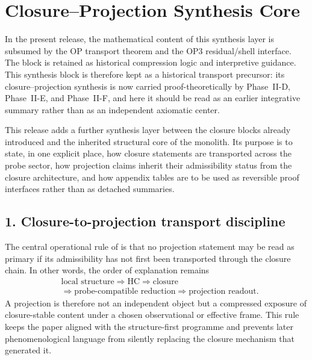 \section*{ Closure--Projection Synthesis Core}

\begin{remark}
\label{rem:normalization-note-v170}
In the present release, the mathematical content of this synthesis layer is subsumed by the OP transport theorem and the OP3 residual/shell interface. The block is retained as historical compression logic and interpretive guidance. This synthesis block is therefore kept as a historical transport precursor: its closure--projection synthesis is now carried proof-theoretically by Phase~II-D, Phase~II-E, and Phase~II-F, and here it should be read as an earlier integrative summary rather than as an independent axiomatic center.
\end{remark}

This release adds a further synthesis layer between the closure blocks already
introduced and the inherited structural core of the monolith. Its purpose is to
state, in one explicit place, how closure statements are transported across the
probe sector, how projection claims inherit their admissibility status from the
closure architecture, and how appendix tables are to be used as reversible proof
interfaces rather than as detached summaries.

\subsection*{1. Closure-to-projection transport discipline}
The central operational rule of  is that no projection statement may be
read as primary if its admissibility has not first been transported through the
closure chain. In other words, the order of explanation remains
\[
\begin{aligned}
&\text{local structure}
\Longrightarrow \text{HC}
\Longrightarrow \text{closure}\\[0.15em]
&\Longrightarrow \text{probe-compatible reduction}
\Longrightarrow \text{projection readout}.
\end{aligned}
\]
A projection is therefore not an independent object but a compressed exposure of
closure-stable content under a chosen observational or effective frame. This
rule keeps the paper aligned with the structure-first programme and prevents
later phenomenological language from silently replacing the closure mechanism
that generated it.

